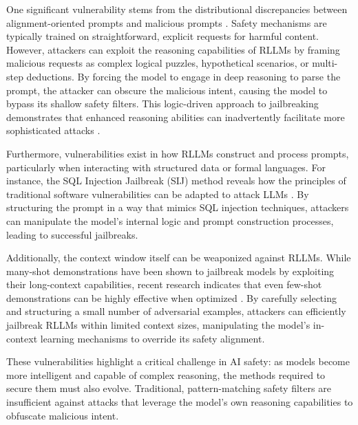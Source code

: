 \documentclass[11pt,a4paper]{article}
\begin{document}
One significant vulnerability stems from the distributional discrepancies between alignment-oriented prompts and malicious prompts \cite{Peng_2025_LLM}. Safety mechanisms are typically trained on straightforward, explicit requests for harmful content. However, attackers can exploit the reasoning capabilities of RLLMs by framing malicious requests as complex logical puzzles, hypothetical scenarios, or multi-step deductions. By forcing the model to engage in deep reasoning to parse the prompt, the attacker can obscure the malicious intent, causing the model to bypass its shallow safety filters. This logic-driven approach to jailbreaking demonstrates that enhanced reasoning abilities can inadvertently facilitate more sophisticated attacks \cite{Peng_2025_LLM}.

Furthermore, vulnerabilities exist in how RLLMs construct and process prompts, particularly when interacting with structured data or formal languages. For instance, the SQL Injection Jailbreak (SIJ) method reveals how the principles of traditional software vulnerabilities can be adapted to attack LLMs \cite{Zhao_2024_SQL}. By structuring the prompt in a way that mimics SQL injection techniques, attackers can manipulate the model's internal logic and prompt construction processes, leading to successful jailbreaks.

Additionally, the context window itself can be weaponized against RLLMs. While many-shot demonstrations have been shown to jailbreak models by exploiting their long-context capabilities, recent research indicates that even few-shot demonstrations can be highly effective when optimized \cite{Zheng_2024_Improved}. By carefully selecting and structuring a small number of adversarial examples, attackers can efficiently jailbreak RLLMs within limited context sizes, manipulating the model's in-context learning mechanisms to override its safety alignment.

These vulnerabilities highlight a critical challenge in AI safety: as models become more intelligent and capable of complex reasoning, the methods required to secure them must also evolve. Traditional, pattern-matching safety filters are insufficient against attacks that leverage the model's own reasoning capabilities to obfuscate malicious intent.
\end{document}
